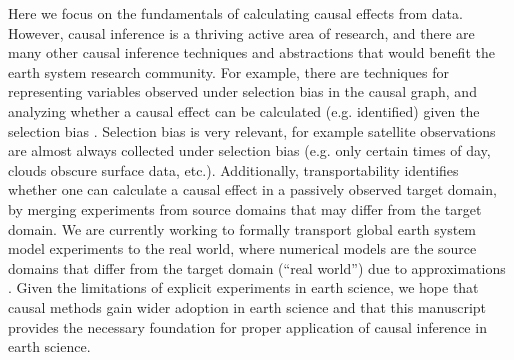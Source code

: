 \documentclass[12pt]{article}
\begin{document}
Here we focus on the fundamentals of calculating causal effects from
data. However, causal inference is a thriving active area of
research, and there are many other causal inference techniques and
abstractions that would benefit the earth system research
community. For example, there are techniques for representing
variables observed under selection bias in the causal graph, and
analyzing whether a causal effect can be calculated (e.g. identified)
given the selection bias
\citep[e.g.,][]{bareinboim2014recovering}. Selection bias is very
relevant, for example satellite observations are almost always
collected under selection bias (e.g. only certain times of day, clouds
obscure surface data, etc.). Additionally, transportability
\citep[e.g.,][]{bareinboim2012transportability} identifies whether one
can calculate a causal effect in a passively observed target domain,
by merging experiments from source domains that may differ from the
target domain. We are currently working to formally transport global
earth system model experiments to the real world, where numerical
models are the source domains that differ from the target domain
(``real world'') due to approximations \citep[][in
prep]{massmann}. Given the limitations of explicit experiments in
earth science, we hope that causal methods gain wider adoption in
earth science and that this manuscript provides the necessary
foundation for proper application of causal inference in earth
science.


\end{document}
